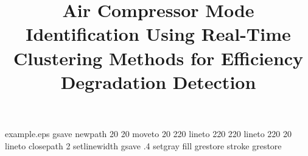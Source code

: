 %
%
%
%
%
\begin{filecontents*}{example.eps}
gsave
newpath
  20 20 moveto
  20 220 lineto
  220 220 lineto
  220 20 lineto
closepath
2 setlinewidth
gsave
  .4 setgray fill
grestore
stroke
grestore
\end{filecontents*}
%
\RequirePackage{fix-cm}
%
\documentclass[twocolumn]{svjour3}          %
%
\smartqed  %
%
\usepackage{graphicx}
%
\usepackage{mathptmx}      %
%
%
\usepackage{natbib} %
\usepackage{hyperref}



\usepackage{booktabs}
\usepackage{multirow}
\usepackage{tabularx}
\usepackage{longtable}
\usepackage{lipsum}
\usepackage{lscape}
\usepackage{siunitx}
\usepackage{amsmath}
\usepackage{rotating}
%
%


\title{Air Compressor Mode Identification Using Real-Time Clustering Methods for Efficiency Degradation Detection%
}

